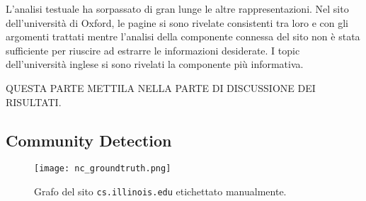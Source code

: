 L'analisi testuale ha sorpassato di gran lunge le altre rappresentazioni. Nel sito dell'università di Oxford, le pagine si sono rivelate consistenti tra loro e con gli argomenti trattati mentre l'analisi della componente connessa del sito non è stata sufficiente per riuscire ad estrarre le informazioni desiderate. I topic dell'università inglese si sono rivelati la componente più informativa.

\color{red}
QUESTA PARTE METTILA NELLA PARTE DI DISCUSSIONE DEI RISULTATI.


\color{black}
\subsection{Community Detection}
 
\begin{figure}[htb]
	\centering
	\texttt{[image: nc\_groundtruth.png]}
	\caption{Grafo del sito \texttt{cs.illinois.edu} etichettato manualmente.}
	\label{nc_groundtruth}
\end{figure}

